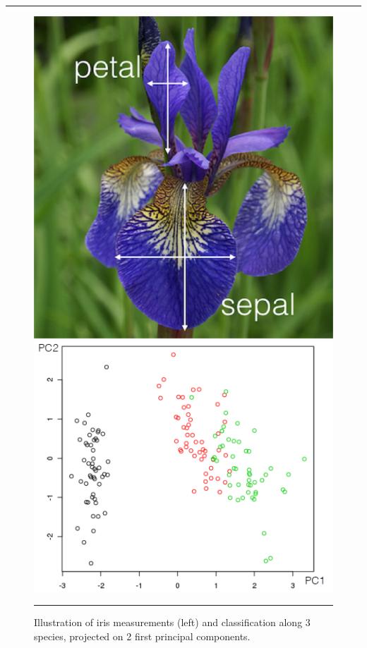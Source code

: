 \begin{center}
    \rule{0.5\textwidth}{.4pt}
\end{center} 
\begin{figure}[!t]
\centering
\includegraphics[height=0.3\textheight]{images/DSML/clustering12.png}\quad \includegraphics[height=0.3\textheight]{images/DSML/clustering13.png} 
\caption[\small Illustration of iris measurements and dataset visualisation.]{\small Illustration of iris measurements (left) and classification along 3 species, projected on 2 first principal components.}\hrule\label{fig:clust1213}
\end{figure}
